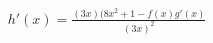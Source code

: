 \documentclass[preview]{standalone}
\begin{document}
\begin{align*}
h'(x) = \frac{(3x)(8x^2+1-f(x)g'(x)}{(3x)^2}
\end{align*}
\end{document}
